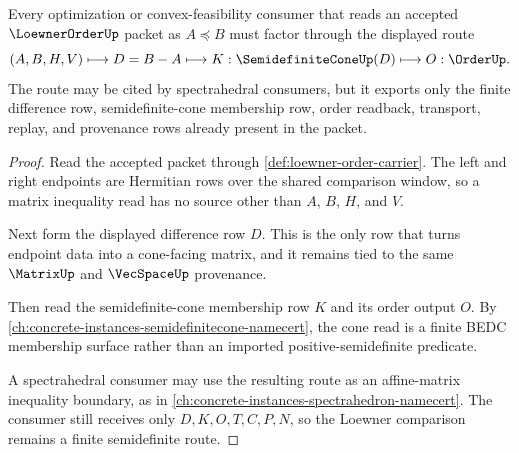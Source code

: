 \begin{theorem}
\label{thm:loewner-order-semidefinite-route}
Every optimization or convex-feasibility consumer that reads an accepted $\LoewnerOrderUp$ packet as $A \preceq B$ must factor through the displayed route
$$
(A,B,H,V) \longmapsto D=B-A \longmapsto K:\SemidefiniteConeUp(D) \longmapsto O:\OrderUp.
$$
The route may be cited by spectrahedral consumers, but it exports only the finite difference row, semidefinite-cone membership row, order readback, transport, replay, and provenance rows already present in the packet.
\end{theorem}
\begin{proof}
Read the accepted packet through \autoref{def:loewner-order-carrier}. The left and right endpoints are Hermitian rows over the shared comparison window, so a matrix inequality read has no source other than $A$, $B$, $H$, and $V$.

Next form the displayed difference row $D$. This is the only row that turns endpoint data into a cone-facing matrix, and it remains tied to the same $\MatrixUp$ and $\VecSpaceUp$ provenance.

Then read the semidefinite-cone membership row $K$ and its order output $O$. By \autoref{ch:concrete-instances-semidefinitecone-namecert}, the cone read is a finite BEDC membership surface rather than an imported positive-semidefinite predicate.

A spectrahedral consumer may use the resulting route as an affine-matrix inequality boundary, as in \autoref{ch:concrete-instances-spectrahedron-namecert}. The consumer still receives only $D,K,O,T,C,P,N$, so the Loewner comparison remains a finite semidefinite route.
\end{proof}

